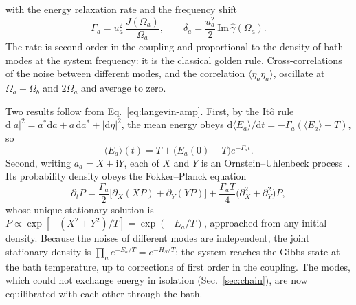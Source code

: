 \documentclass[10pt,a4paper]{article}
\newcommand{\dd}{\mathrm{d}}
\newcommand{\ii}{\mathrm{i}}
\begin{document}
with the energy relaxation rate and the frequency shift
\begin{equation}
  \Gamma_a = u_a^2 \, \frac{J(\Omega_a)}{\Omega_a} ,
  \qquad
  \delta_a = \frac{u_a^2}{2} \, \mathrm{Im}\,\hat\gamma(\Omega_a) .
  \label{eq:gamma-class}
\end{equation}
The rate is second order in the coupling and proportional to the density of bath modes at the system frequency: it is the classical golden rule.
Cross-correlations of the noise between different modes, and the correlation $ \langle \eta_a \eta_a \rangle $, oscillate at $ \Omega_a - \Omega_b $ and $ 2\Omega_a $ and average to zero.

Two results follow from Eq.~\eqref{eq:langevin-amp}.
First, by the It\^o rule $ \dd|a|^2 = a^* \dd a + a \, \dd a^* + |\dd\eta|^2 $, the mean energy obeys $ \dd\langle E_a\rangle/\dd t = -\Gamma_a (\langle E_a\rangle - T) $, so
\begin{equation}
  \langle E_a \rangle(t) = T + \big( E_a(0) - T \big) e^{-\Gamma_a t} .
  \label{eq:Ea-relax}
\end{equation}
Second, writing $ a_a = X + \ii Y $, each of $ X $ and $ Y $ is an Ornstein--Uhlenbeck process~\cite{Risken1989}. Its probability density obeys the Fokker--Planck equation
\begin{equation}
  \partial_t P = \frac{\Gamma_a}{2} \big[ \partial_X (X P) + \partial_Y (Y P) \big] + \frac{\Gamma_a T}{4} \big( \partial_X^2 + \partial_Y^2 \big) P ,
  \label{eq:fokker-planck}
\end{equation}
whose unique stationary solution is $ P \propto \exp[-(X^2 + Y^2)/T] = \exp(-E_a/T) $, approached from any initial density.
Because the noises of different modes are independent, the joint stationary density is $ \prod_a e^{-E_a/T} = e^{-H_S/T} $: the system reaches the Gibbs state at the bath temperature, up to corrections of first order in the coupling.
The modes, which could not exchange energy in isolation (Sec.~\ref{sec:chain}), are now equilibrated with each other through the bath.
\end{document}
